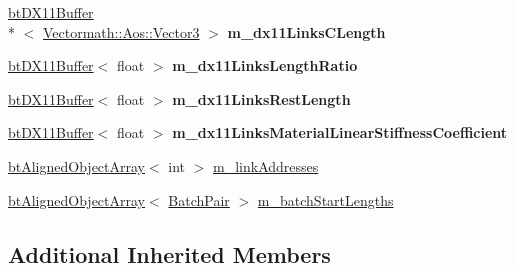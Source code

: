 \begin{DoxyCompactItemize}
\item 
\hypertarget{classbt_soft_body_link_data_d_x11_ac71b99ba9d4edb983d9499003e4ce81f}{\hyperlink{classbt_d_x11_buffer}{bt\+D\+X11\+Buffer}\\*
$<$ \hyperlink{class_vectormath_1_1_aos_1_1_vector3}{Vectormath\+::\+Aos\+::\+Vector3} $>$ {\bfseries m\+\_\+dx11\+Links\+C\+Length}}\label{classbt_soft_body_link_data_d_x11_ac71b99ba9d4edb983d9499003e4ce81f}

\item 
\hypertarget{classbt_soft_body_link_data_d_x11_ac25a2822fd831b09c88def3891db5846}{\hyperlink{classbt_d_x11_buffer}{bt\+D\+X11\+Buffer}$<$ float $>$ {\bfseries m\+\_\+dx11\+Links\+Length\+Ratio}}\label{classbt_soft_body_link_data_d_x11_ac25a2822fd831b09c88def3891db5846}

\item 
\hypertarget{classbt_soft_body_link_data_d_x11_a3d2835a9c31ddf074e3fa500de4f98d2}{\hyperlink{classbt_d_x11_buffer}{bt\+D\+X11\+Buffer}$<$ float $>$ {\bfseries m\+\_\+dx11\+Links\+Rest\+Length}}\label{classbt_soft_body_link_data_d_x11_a3d2835a9c31ddf074e3fa500de4f98d2}

\item 
\hypertarget{classbt_soft_body_link_data_d_x11_a4eddda10317087800b3047601ace83d4}{\hyperlink{classbt_d_x11_buffer}{bt\+D\+X11\+Buffer}$<$ float $>$ {\bfseries m\+\_\+dx11\+Links\+Material\+Linear\+Stiffness\+Coefficient}}\label{classbt_soft_body_link_data_d_x11_a4eddda10317087800b3047601ace83d4}

\item 
\hyperlink{classbt_aligned_object_array}{bt\+Aligned\+Object\+Array}$<$ int $>$ \hyperlink{classbt_soft_body_link_data_d_x11_a712400cc15cbe3fd96d93cfa135f53ef}{m\+\_\+link\+Addresses}
\item 
\hyperlink{classbt_aligned_object_array}{bt\+Aligned\+Object\+Array}$<$ \hyperlink{structbt_soft_body_link_data_d_x11_1_1_batch_pair}{Batch\+Pair} $>$ \hyperlink{classbt_soft_body_link_data_d_x11_af39feddd5c9c8beb3003fb07df835705}{m\+\_\+batch\+Start\+Lengths}
\end{DoxyCompactItemize}
\subsection*{Additional Inherited Members}


